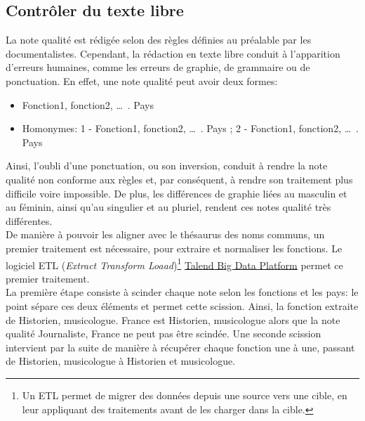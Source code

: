 \subsection{\label{I-C-3-a}Contrôler du texte libre}

La note qualité est rédigée selon des règles définies au préalable par les documentalistes. Cependant, la rédaction en texte libre conduit à l'apparition d'erreurs humaines, comme les erreurs de graphie, de grammaire ou de ponctuation. En effet, une note qualité peut avoir deux formes:
\begin{itemize}
	\item Fonction1, fonction2, \dots~. Pays
	\item Homonymes: 1 - Fonction1, fonction2, \dots~. Pays ; 2 - Fonction1, fonction2, \dots~. Pays 
\end{itemize}
Ainsi, l'oubli d'une ponctuation, ou son inversion, conduit à rendre la note qualité non conforme aux règles et, par conséquent, à rendre son traitement plus difficile voire impossible. De plus, les différences de graphie liées au masculin et au féminin, ainsi qu'au singulier et au pluriel, rendent ces notes qualité très différentes.\\

De manière à pouvoir les aligner avec le thésaurus des noms communs, un premier traitement est nécessaire, pour extraire et normaliser les fonctions. Le logiciel ETL (\textit{Extract Transform Loaad})\footnote{Un ETL permet de migrer des données depuis une source vers une cible, en leur appliquant des traitements avant de les charger dans la cible.} \href{https://www.talend.com/fr/products/big-data/}{Talend Big Data Platform} permet ce premier traitement.\\

La première étape consiste à scinder chaque note selon les fonctions et les pays: le point sépare ces deux éléments et permet cette scission. Ainsi, la fonction extraite de \og Historien, musicologue. France\fg{} est \og Historien, musicologue\fg{} alors que la note qualité \og Journaliste, France\fg{} ne peut pas être scindée. Une seconde scission intervient par la suite de manière à récupérer chaque fonction une à une, passant de \og Historien, musicologue\fg{} à \og Historien\fg{} et \og musicologue\fg{}.\\

